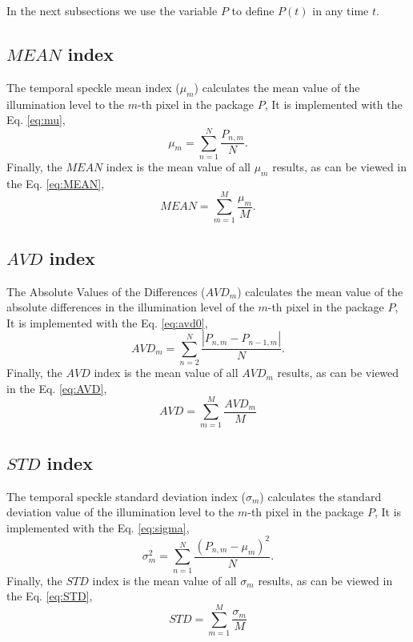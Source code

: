 \documentclass[review]{elsarticle}
\begin{document}
In the next subsections we use the variable $P$ to define $P(t)$ in any time $t$.

\subsection{$MEAN$ index }
\label{sec:mean}

The temporal speckle mean index ($\mu_{m}$) \cite{Nothdurft:05} calculates the mean
value of the illumination level to the $m$-th pixel in the package $P$, It is implemented
with the Eq. \ref{eq:mu},
\begin{equation}\label{eq:mu}
\mu_{m} = \sum \limits_{n=1}^{N} \frac{P_{n,m}}{N}.
\end{equation}
Finally, the $MEAN$ index is the mean value of all $\mu_{m}$ results,
as can be viewed in the Eq. \ref{eq:MEAN},
\begin{equation}\label{eq:MEAN}
MEAN = \sum \limits_{m=1}^{M} \frac{\mu_{m}}{M}.
\end{equation}


\subsection{$AVD$ index}
\label{sec:avd}

The Absolute Values of the Differences ($AVD_{m}$) \cite{cardoso2014,rivera2017selection} calculates the mean
value of the absolute differences in the illumination level of the $m$-th pixel in the package $P$, It is implemented
with the Eq. \ref{eq:avd0},
\begin{equation}\label{eq:avd0}
AVD_{m} = \sum \limits_{n=2}^{N} \frac{|P_{n,m}-P_{n-1,m}|}{N}.
\end{equation}
Finally, the $AVD$ index is the mean value of all $AVD_{m}$ results,
as can be viewed in the Eq. \ref{eq:AVD},
\begin{equation}\label{eq:AVD}
AVD = \sum \limits_{m=1}^{M} \frac{AVD_{m}}{M}
\end{equation}



\subsection{$STD$ index}
\label{sec:std}


The temporal speckle standard deviation index ($\sigma_{m}$) \cite{Nothdurft:05} calculates the standard deviation
value of the illumination level to the $m$-th pixel in the package $P$, It is implemented
with the Eq. \ref{eq:sigma},
\begin{equation}\label{eq:sigma}
\sigma_{m}^2 = \sum \limits_{n=1}^{N} \frac{(P_{n,m}-\mu_{m})^2}{N}.
\end{equation}
Finally, the $STD$ index is the mean value of all $\sigma_{m}$ results,
as can be viewed in the Eq. \ref{eq:STD},
\begin{equation}\label{eq:STD}
STD = \sum \limits_{m=1}^{M} \frac{\sigma_{m}}{M}
\end{equation}
\end{document}
